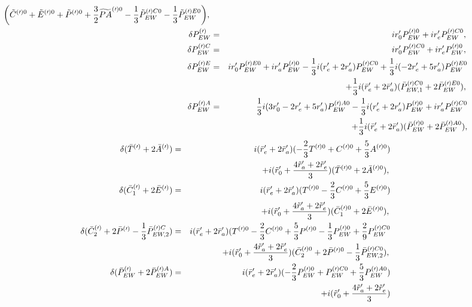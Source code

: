 \documentclass[aps,preprint,floats,epsf,epsfig,nofootinbib,letter]{revtex4}
\newcommand{\be}{\begin{eqnarray}}
\newcommand{\en}{\end{eqnarray}}
\newcommand{\non}{{\nonumber}}
\begin{document}
\begin{eqnarray}
\bigg(\tilde C^{(\prime)0}+\tilde E^{(\prime)0}+\tilde P^{(\prime)0} +\frac{3}{2}\widetilde {PA}^{(\prime)0}-\frac{1}{3}\tilde P^{(\prime)C0}_{EW} -\frac{1}{3}\tilde P^{(\prime)E0}_{EW}\bigg),
\non\\
\delta P^{(\prime)}_{EW}&=&ir'_0 P^{(\prime)0}_{EW}+i r'_e P_{EW}^{(\prime)C0},
\non\\
\delta P_{EW}^{(\prime)C}&=&ir'_0 P_{EW}^{(\prime)C0}+i r'_e P_{EW}^{(\prime)0},
\non\\
\delta P_{EW}^{(\prime)E}&=&ir'_0 P_{EW}^{(\prime)E0}+ ir'_a P^{(\prime)0}_{EW}
-\frac{1}{3} i (r'_e+2 r'_a) P_{EW}^{(\prime)C0}
+\frac{1}{3}i(-2r'_e +5 r'_a) P_{EW}^{(\prime)E0}
\non\\
&&+\frac{1}{3}i(\bar r'_e+2\bar r'_a)(\bar P^{(\prime)C0}_{EW,1}  +2\bar P^{(\prime)E0}_{EW}),
\non\\
\delta P^{(\prime)A}_{EW}&=&
\frac{1}{3} i (3r'_0-2 r'_e +5r'_a) P_{EW}^{(\prime)A0}
-\frac{1}{3}i(r'_e +2r'_a) P^{(\prime)0}_{EW}
+ir'_a P^{(\prime)C0}_{EW}
\non\\
&&+\frac{1}{3}i(\bar r'_e+2\bar r'_a)(\bar P^{(\prime)0}_{EW} +2\bar P^{(\prime)A0}_{EW}),
\label{eq: delta TA1}
\en
\be
\delta (\bar T^{(\prime)}+2\bar A^{(\prime)})
&=&i(\bar r'_e+2\bar r'_a) (-\frac{2}{3}T^{(\prime)0}+C^{(\prime)0}+\frac{5}{3} A^{(\prime)0})
\non\\
&&
+i(\tilde r'_0 +\frac{4\tilde r'_a +2\tilde r'_e}{3})(\bar T^{(\prime)0}+2\bar A^{(\prime)0}),
\non\\
\delta (\bar C^{(\prime)}_1+2\bar E^{(\prime)})
&=&i(\bar r'_e+2\bar r'_a) (T^{(\prime)0} -\frac{2}{3} C^{(\prime)0}+\frac{5}{3} E^{(\prime)0})
\non\\
&&
+i(\tilde r'_0 +\frac{4\tilde r'_a +2\tilde r'_e}{3})(\bar C^{(\prime)0}_1+2\bar E^{(\prime)0}),
\non\\
\delta (\bar C^{(\prime)}_2+2\bar P^{(\prime)}-\frac{1}{3}\bar P^{(\prime)C}_{EW,2})
&=&i(\bar r'_e+2\bar r'_a) (T^{(\prime)0}-\frac{2}{3}  C^{(\prime)0}+\frac{5}{3} P^{(\prime)0}-\frac{1}{3} P^{(\prime)0}_{EW}+\frac{2}{9} P^{(\prime)C0}_{EW}
\non\\
&&+i(\tilde r'_0 +\frac{4\tilde r'_a +2\tilde r'_e}{3})
(\bar C^{(\prime)0}_2+2\bar P^{(\prime)0}-\frac{1}{3}\bar P^{(\prime)C0}_{EW,2}),
\non\\
\delta (\bar P^{(\prime)}_{EW} +2\bar P^{(\prime)A}_{EW})&=& 
i(\bar r'_e+2\bar r'_a)(-\frac{2}{3} P^{(\prime)0}_{EW}+ P^{(\prime)C0}_{EW}+\frac{5}{3} P^{(\prime)A0}_{EW})
\non\\
&&+i(\tilde r'_0 +\frac{4\tilde r'_a +2\tilde r'_e}{3})

\end{eqnarray}
\end{document}
